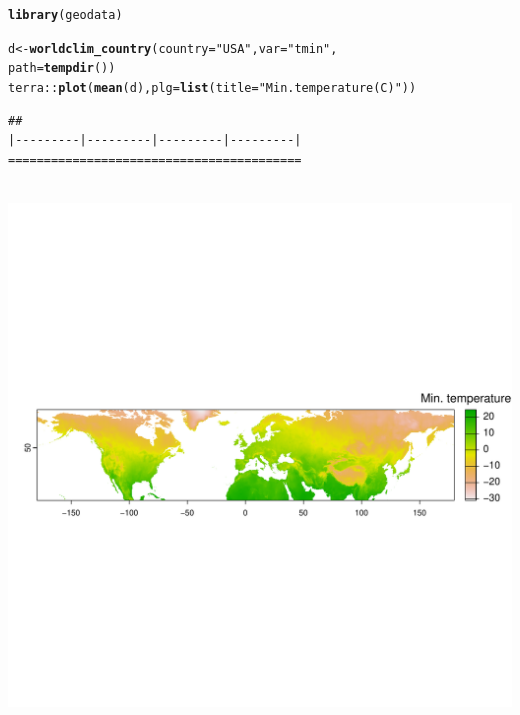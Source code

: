 \documentclass{article}\usepackage[]{graphicx}\usepackage[]{xcolor}
\makeatletter
\def\maxwidth{ %
  \ifdim\Gin@nat@width>\linewidth
    \linewidth
  \else
    \Gin@nat@width
  \fi
}
\newcommand{\hlstr}[1]{\textcolor[rgb]{0.192,0.494,0.8}{#1}}%
\newcommand{\hlopt}[1]{\textcolor[rgb]{0,0,0}{#1}}%
\newcommand{\hlstd}[1]{\textcolor[rgb]{0.345,0.345,0.345}{#1}}%
\newcommand{\hlkwb}[1]{\textcolor[rgb]{0.69,0.353,0.396}{#1}}%
\newcommand{\hlkwc}[1]{\textcolor[rgb]{0.333,0.667,0.333}{#1}}%
\newcommand{\hlkwd}[1]{\textcolor[rgb]{0.737,0.353,0.396}{\textbf{#1}}}%
\newenvironment{kframe}{%
 \def\at@end@of@kframe{}%
 \ifinner\ifhmode%
  \def\at@end@of@kframe{\end{minipage}}%
  \begin{minipage}{\columnwidth}%
 \fi\fi%
 \def\FrameCommand##1{\hskip\@totalleftmargin \hskip-\fboxsep
 \colorbox{shadecolor}{##1}\hskip-\fboxsep
     \hskip-\linewidth \hskip-\@totalleftmargin \hskip\columnwidth}%
 \MakeFramed {\advance\hsize-\width
   \@totalleftmargin\z@ \linewidth\hsize
   \@setminipage}}%
 {\par\unskip\endMakeFramed%
 \at@end@of@kframe}
\newenvironment{knitrout}{}{} %
\makeatother
\begin{document}
\begin{knitrout}
\color{fgcolor}\begin{kframe}
\begin{alltt}
\hlkwd{library}\hlstd{(geodata)}
\end{alltt}


{\ttfamily\noindent\itshape\color{messagecolor}{\#\# Loading required package: terra}}

{\ttfamily\noindent\itshape\color{messagecolor}{\#\# terra 1.7.55}}

{\ttfamily\noindent\itshape\color{messagecolor}{\#\# \\\#\# Attaching package: 'terra'}}

{\ttfamily\noindent\itshape\color{messagecolor}{\#\# The following object is masked from 'package:knitr':\\\#\# \\\#\# \ \ \ \ spin}}\begin{alltt}
\hlstd{d} \hlkwb{<-} \hlkwd{worldclim_country}\hlstd{(}\hlkwc{country} \hlstd{=} \hlstr{"USA"}\hlstd{,} \hlkwc{var} \hlstd{=} \hlstr{"tmin"}\hlstd{,}
                       \hlkwc{path} \hlstd{=} \hlkwd{tempdir}\hlstd{())}
\hlstd{terra}\hlopt{::}\hlkwd{plot}\hlstd{(}\hlkwd{mean}\hlstd{(d),} \hlkwc{plg} \hlstd{=} \hlkwd{list}\hlstd{(}\hlkwc{title} \hlstd{=} \hlstr{"Min. temperature (C)"}\hlstd{))}
\end{alltt}
\begin{verbatim}
## 
|---------|---------|---------|---------|
=========================================
                                          
\end{verbatim}
\end{kframe}
\includegraphics[width=\maxwidth]{figure/unnamed-chunk-2-1} 
\end{knitrout}
\end{document}
